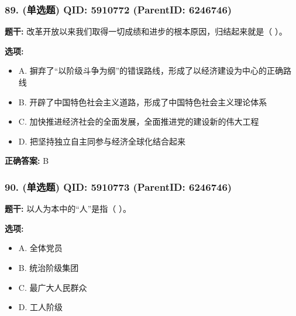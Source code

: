 \documentclass[12pt,UTF8]{ctexart}
\begin{document}
\vspace{0.3em}\hrulefill\vspace{0.7em}

\subsubsection*{89. (单选题) \small QID: 5910772 (ParentID: 6246746)}

\textbf{题干:}
改革开放以来我们取得一切成绩和进步的根本原因，归结起来就是（ ）。



\textbf{选项:}
\begin{itemize}[leftmargin=*]

  \item A. 摒弃了“以阶级斗争为纲”的错误路线，形成了以经济建设为中心的正确路线

  \item B. 开辟了中国特色社会主义道路，形成了中国特色社会主义理论体系

  \item C. 加快推进经济社会的全面发展，全面推进党的建设新的伟大工程

  \item D. 把坚持独立自主同参与经济全球化结合起来

\end{itemize}

\textbf{正确答案:}
B

\vspace{0.3em}\hrulefill\vspace{0.7em}

\subsubsection*{90. (单选题) \small QID: 5910773 (ParentID: 6246746)}

\textbf{题干:}
以人为本中的“人”是指（ ）。



\textbf{选项:}
\begin{itemize}[leftmargin=*]

  \item A. 全体党员

  \item B. 统治阶级集团

  \item C. 最广大人民群众

  \item D. 工人阶级

\end{itemize}
\end{document}
